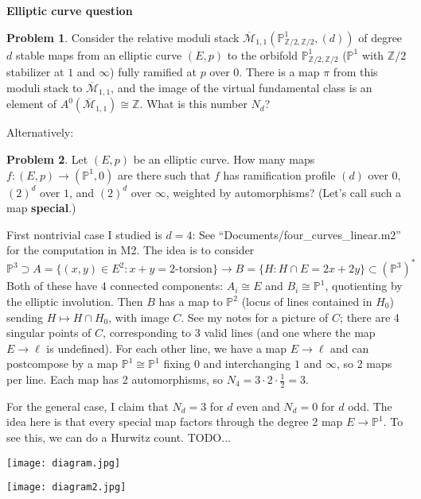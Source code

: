 \documentclass[11pt]{article}           %
\newcommand{\thishw}{\bf Elliptic curve question}
\newcommand{\Z}{\ensuremath{\mathbb{Z}}}
\renewcommand{\P}{\mathbb P}
\theoremstyle{definition}
\newtheorem*{prob}{Problem}
\theoremstyle{definition}
\begin{document}
\centerline{\LARGE\thishw}
\begin{prob}
  Consider the relative moduli stack $\overline{\mathcal M}_{1,1}(\P^1_{\Z/2,\Z/2},(d))$ of degree $d$ stable maps from an elliptic curve $(E,p)$
  to the orbifold $\P^1_{\Z/2,\Z/2}$ ($\P^1$ with $\Z/2$ stabilizer at $1$ and $\infty$) fully ramified at $p$ over $0$.
  There is a map $\pi$ from this moduli stack to $\overline{\mathcal M}_{1,1}$, and the image of the virtual fundamental class is an element of $A^0(\overline{\mathcal M}_{1,1})\cong \Z$.
  What is this number $N_d$?
\end{prob}

Alternatively:

\begin{prob}
  Let $(E,p)$ be an elliptic curve. How many maps $f:(E,p)\to (\P^1,0)$ are there such that $f$ has ramification profile $(d)$ over $0$, $(2)^d$ over $1$, and $(2)^d$ over $\infty$, weighted by automorphisms? (Let's call such a map {\bf special}.)
\end{prob}

First nontrivial case I studied is $d=4$:
See ``Documents/four\_curves\_linear.m2'' for the computation in M2. The idea is to consider
\[
\P^3\supset A=\{(x,y)\in E^2:x+y=\text{2-torsion}\}\to B=\{H:H\cap E=2x+2y\}\subset(\P^3)^*
\]
Both of these have 4 connected components: $A_i\cong E$ and $B_i\cong\P^1$, quotienting by the elliptic involution. Then $B$ has a map
to $\P^2$ (locus of lines contained in $H_0$) sending $H\mapsto H\cap H_0$, with image $C$. See my notes for a picture of $C$;
there are 4 singular points of $C$, corresponding to $3$ valid lines (and one where the map $E\to\ell$ is undefined). For each other line,
we have a map $E\to \ell$ and can postcompose by a map $\P^1\cong\P^1$ fixing $0$ and interchanging $1$ and $\infty$, so 2 maps per line.
Each map has 2 automorphisms, so $N_4=3\cdot 2\cdot\frac 12=3$.

For the general case, I claim that $N_d=3$ for $d$ even and $N_d=0$ for $d$ odd. The idea here is that every special map factors through the degree 2 map $E\to\P^1$. To see this, we can do a Hurwitz count. TODO...

\texttt{[image: diagram.jpg]}

\texttt{[image: diagram2.jpg]}
\end{document}
